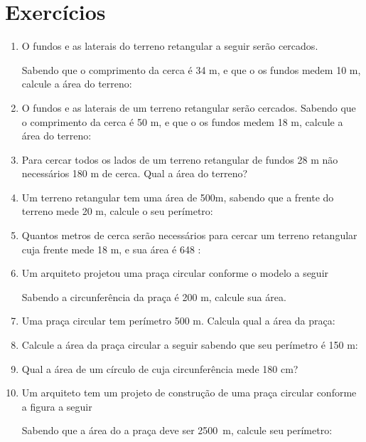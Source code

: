 \documentclass[twocolumn,oneside,a4paper,11pt]{article}
\begin{document}
\section*{Exercícios}
\begin{enumerate}
\item O fundos e as laterais do terreno retangular a seguir serão cercados.

Sabendo que o comprimento da cerca é 34 m, e que o os fundos medem 10 m, calcule a área do terreno:

\item O fundos e as laterais de um terreno retangular serão cercados. Sabendo que o comprimento da cerca é 50 m, e que o os fundos medem 18 m, calcule a área do terreno:

\item Para cercar todos os lados de um terreno retangular de fundos 28 m não necessários 180 m de cerca. Qual a área do terreno?

\item Um terreno retangular tem uma área de 500m, sabendo que a frente do terreno mede 20 m, calcule o seu perímetro:

\item Quantos metros de cerca serão necessários para cercar um terreno retangular cuja frente mede 18 m, e sua área é 648 :

\item Um arquiteto projetou uma praça circular conforme o modelo a seguir

Sabendo a circunferência da praça é 200 m, calcule sua área.

\item Uma praça circular tem perímetro 500 m. Calcula qual a área da praça:

\item Calcule a área da praça circular a seguir sabendo que seu perímetro é 150 m:

\item Qual a área de um círculo de cuja circunferência mede 180 cm?



\item Um arquiteto tem um projeto de construção de uma praça circular conforme a figura a seguir

Sabendo que a área do a praça deve ser 2500~m, calcule seu perímetro:


\end{enumerate}
\end{document}
